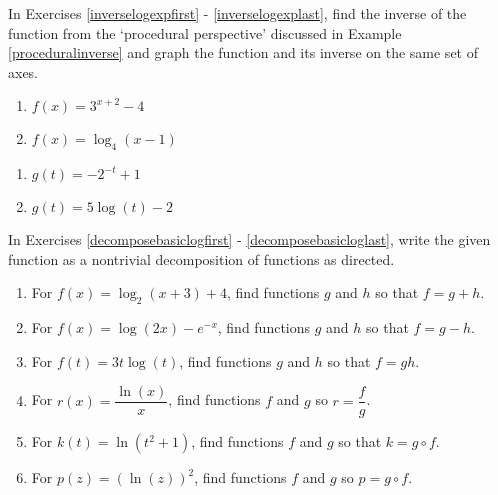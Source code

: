 \documentclass{ximera}
\begin{document}
In Exercises \ref{inverselogexpfirst} - \ref{inverselogexplast},  find the inverse of the function from the `procedural perspective' discussed in Example \ref{proceduralinverse} and graph the function and its inverse on the same set of axes.

\begin{multicols}{2}
\begin{enumerate}
\setcounter{enumi}{\value{HW}}

\item $f(x) = 3^{x + 2} - 4$  \label{inverselogexpfirst} 
\item $f(x) = \log_{4}(x - 1)$

\setcounter{HW}{\value{enumi}}
\end{enumerate}
\end{multicols}

\enlargethispage{.5in}
\vspace{-.2in}

\begin{multicols}{2}
\begin{enumerate}
\setcounter{enumi}{\value{HW}}

\item $g(t)= -2^{-t} + 1$
\item $g(t) = 5\log(t) - 2$ \label{inverselogexplast}

\setcounter{HW}{\value{enumi}}
\end{enumerate}
\end{multicols}

In Exercises \ref{decomposebasiclogfirst} - \ref{decomposebasicloglast}, write the given function as a nontrivial decomposition of functions as directed.

\begin{enumerate}
\setcounter{enumi}{\value{HW}}

\item  For $f(x) = \log_{2}(x+3) + 4$, find functions $g$ and $h$ so that $f=g+h$. \label{decomposebasiclogfirst}
\item  For $f(x) = \log(2x) - e^{-x}$, find functions $g$ and $h$ so that $f=g-h$. 
\item  For $f(t) = 3t \log(t)$, find functions $g$ and $h$ so that $f=gh$.
\item  For $r(x) = \dfrac{\ln(x)}{x}$, find functions $f$ and $g$ so $r = \dfrac{f}{g}$.
\item  For $k(t) = \ln(t^2+1)$, find functions $f$ and $g$  so that $k = g \circ f$.
\item  For $p(z) = (\ln(z))^2$, find functions $f$ and $g$ so $p = g \circ f$. \label{decomposebasicloglast}

\setcounter{HW}{\value{enumi}}
\end{enumerate}
\end{document}
